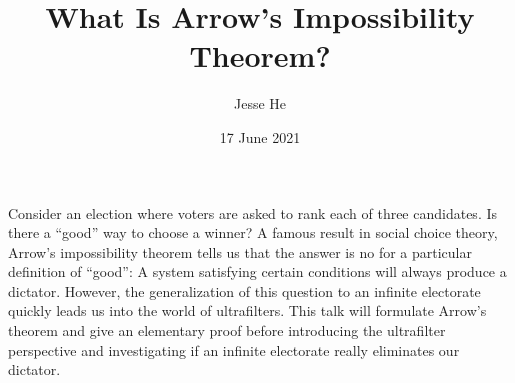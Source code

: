 \documentclass{article}
\title{What Is Arrow's Impossibility Theorem?}
\author{Jesse He}
\date{17 June 2021}
\begin{document}
\maketitle

Consider an election where voters are asked to rank each of three candidates. Is there a ``good'' way to choose a winner?
A famous result in social choice theory, Arrow's impossibility theorem tells us that the answer is no for a particular
definition of ``good'': A system satisfying certain conditions will always produce a dictator. However, the generalization
of this question to an infinite electorate quickly leads us into the world of ultrafilters.
This talk will formulate Arrow's theorem and give an elementary proof before introducing the ultrafilter perspective
and investigating if an infinite electorate really eliminates our dictator.
\end{document}
